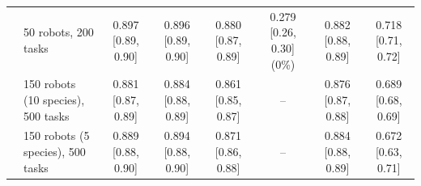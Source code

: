 \begin{table}[t]
{\begin{tabular}{llcccccc}
 & 50 robots, 200 tasks & 0.897 {\scriptsize [0.89, 0.90]} & 0.896 {\scriptsize [0.89, 0.90]} & 0.880 {\scriptsize [0.87, 0.89]} & 0.279 {\scriptsize [0.26, 0.30]} (0\%) & 0.882 {\scriptsize [0.88, 0.89]} & 0.718 {\scriptsize [0.71, 0.72]} \\
 & 150 robots (10 species), 500 tasks & 0.881 {\scriptsize [0.87, 0.89]} & 0.884 {\scriptsize [0.88, 0.89]} & 0.861 {\scriptsize [0.85, 0.87]} & -- & 0.876 {\scriptsize [0.87, 0.88]} & 0.689 {\scriptsize [0.68, 0.69]} \\
 & 150 robots (5 species), 500 tasks & 0.889 {\scriptsize [0.88, 0.90]} & 0.894 {\scriptsize [0.88, 0.90]} & 0.871 {\scriptsize [0.86, 0.88]} & -- & 0.884 {\scriptsize [0.88, 0.89]} & 0.672 {\scriptsize [0.63, 0.71]} \\
\bottomrule
\end{tabular}}
\end{table}
